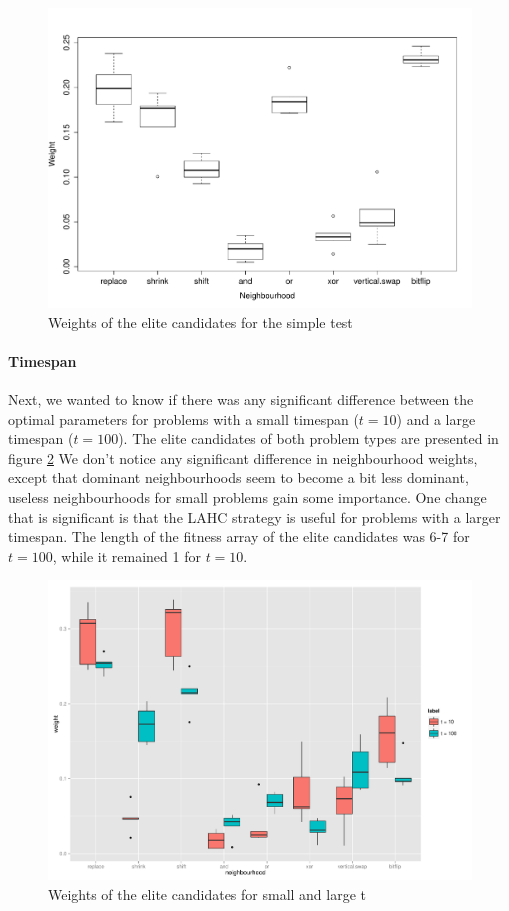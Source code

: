 \documentclass[]{article}
\begin{document}
\begin{figure}
	\includegraphics[width=\textwidth]{boxplot_general.pdf}
	\caption{Weights of the elite candidates for the simple test}
	\label{fig:general}
\end{figure}

\paragraph{Timespan}
Next, we wanted to know if there was any significant difference between the optimal parameters for problems with a small timespan ($t = 10$) and a large timespan ($t=100$). The elite candidates of both problem types are presented in figure \ref{fig:t} We don't notice any significant difference in neighbourhood weights, except that dominant neighbourhoods seem to become a bit less dominant, useless neighbourhoods for small problems gain some importance. One change that is significant is that the LAHC strategy is useful for problems with a larger timespan. The length of the fitness array of the elite candidates was 6-7 for $t = 100$, while it remained 1 for $t = 10$.

\begin{figure}
	\includegraphics[width=\textwidth]{boxplot_t.pdf}
	\caption{Weights of the elite candidates for small and large t}
	\label{fig:t}
\end{figure}
\end{document}

